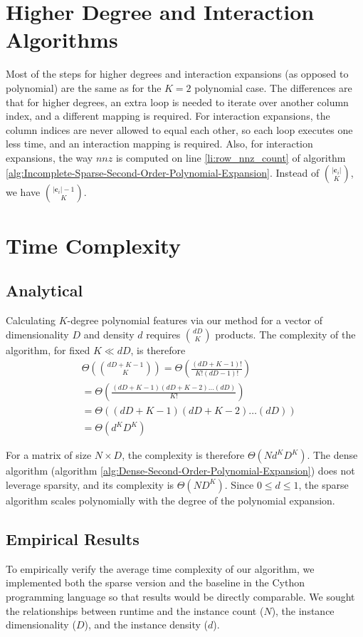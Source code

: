 \documentclass{article}
\begin{document}
\section{Higher Degree and Interaction Algorithms}
Most of the steps for higher degrees and interaction expansions (as opposed to polynomial) are the same as for the $K=2$ polynomial case.
The differences are that for higher degrees, an extra loop is needed to iterate over another column index, and a different mapping is required.
For interaction expansions, the column indices are never allowed to equal each other, so each loop executes one less time, and an interaction mapping is required.
Also, for interaction expansions, the way $nnz$ is computed on line \ref{li:row_nnz_count} of algorithm \ref{alg:Incomplete-Sparse-Second-Order-Polynomial-Expansion}.
Instead of $\binom{|\bm{c}_i|}{K}$, we have $\binom{|\bm{c}_i|-1}{K}$.

\section{Time Complexity}
\subsection{Analytical}
\label{sec:analytical}

Calculating $K$-degree polynomial features via our method for a vector of dimensionality $D$ and density $d$ requires $\binom{dD}{K}$ products.
The complexity of the algorithm, for fixed $K \ll dD$, is therefore
\begin{align}
& \Theta\left(\binom{dD+K-1}{K}\right) = \Theta\left(\frac{(dD+K-1)!}{K!(dD-1)!}\right)\\
& = \Theta\left(\frac{(dD+K-1)(dD+K-2) \dots (dD)}{K!}\right)\\
& = \Theta\left((dD+K-1)(dD+K-2) \dots (dD)\right)\\
& = \Theta\left(d^KD^K\right)
\end{align}

For a matrix of size $N \times D$, the complexity is therefore $\Theta\left(Nd^KD^K\right)$.
The dense algorithm (algorithm \ref{alg:Dense-Second-Order-Polynomial-Expansion}) does not leverage sparsity, and its complexity is $\Theta\left(ND^K\right)$.
Since $0 \le d \le 1$, the sparse algorithm scales polynomially with the degree of the polynomial expansion.

\subsection{Empirical Results}
To empirically verify the average time complexity of our algorithm, we implemented both the sparse version and the baseline in the Cython programming language so that results would be directly comparable.
We sought the relationships between runtime and the instance count ($N$), the instance dimensionality ($D$), and the instance density ($d$).
\end{document}
